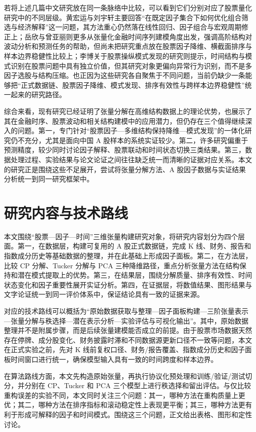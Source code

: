 若将上述几篇中文研究放在同一条脉络中比较，可以看到它们分别对应了股票量化研究中的不同层级。黄宏运与刘宇轩主要回答“在既定因子集合下如何优化组合筛选与经济解释”这一问题，其方法重心仍然落在线性回归、因子组合与宏观周期修正上；岳欣与曾亚丽则更多从张量化金融时间序列建模角度出发，强调高阶结构对波动分析和预测任务的帮助，但尚未把研究重点放在股票因子降维、横截面排序与样本边界稳健性比较上；李博关于股票操纵模式发现的研究则提示，时间结构与模式识别在股票问题中具有独立价值，但其研究对象更偏向异常行为识别，而不是多因子选股与结构压缩。也正因为这些研究各自聚焦于不同问题，当前仍缺少一条能够把“正式数据链、股票因子降维、模式发现、排序有效性与跨样本边界稳健性”统一起来的研究路径。

综合来看，现有研究已经证明了张量分解在高维结构数据上的理论优势，也展示了其在金融时序、股票波动和相关结构建模中的应用潜力，但仍存在三个值得继续深入的问题。第一，专门针对“股票因子—多维结构保持降维—模式发现”的一体化研究仍不充分，尤其是面向中国 A 股样本的系统实证较少。第二，许多研究偏重于预测精度，较少同时讨论因子解释、股票联动和时间状态切换三类结果。第三，数据处理过程、实验结果与论文论证之间往往缺乏统一而清晰的证据对应关系。本文的研究正是围绕这些不足展开，尝试将张量分解方法、A 股因子数据与实证结果分析统一到同一研究框架中。

\section{研究内容与技术路线}

本文围绕“股票—因子—时间”三维张量构建研究对象，将研究内容划分为四个层面。第一，在数据层，构建可复用的 A 股正式数据链，完成 K 线、财务、报告和指数成分历史等基础数据的整理，并在此基础上形成因子面板。第二，在方法层，比较 CP 分解、Tucker 分解与 PCA 三种降维路径，重点分析张量方法在结构保持和潜在模式提取上的优势。第三，在结果层，围绕分解质量、排序有效性、时间状态变化和因子重要性展开实证分析。第四，在证据层，将数值结果、图形结果与文字论证统一到同一评价体系中，保证结论具有一致的证据来源。

对应的技术路线可以概括为“原始数据获取与整理—因子面板构建—三阶张量表示—张量分解与秩选择—潜在表示分析—实验评估与可视化输出”。其中，原始数据整理并不是附属步骤，而是后续张量建模能否成立的前提。由于股票市场数据天然存在停牌、成分股变化、财务披露时滞和不同数据源更新口径不一致等问题，本文在正式实验之前，先对 K 线前复权口径、财务/报告覆盖、指数成分历史和因子面板时间窗口进行统一，确保模型输入具有一致的时间跨度和样本边界。

在算法路线方面，本文先构造原始张量，再执行协议化预处理和训练/验证/测试切分，并分别在 CP、Tucker 和 PCA 三个模型上进行秩选择和留出评估。与仅比较重构误差的实验不同，本文同时关注三个问题：其一，哪种方法在重构质量上更优；其二，哪种方法在排序指标和滚动稳定性上表现更平衡；其三，哪种方法更有利于形成可解释的因子和时间模式。围绕这三个问题，正文给出表格、图形和定性讨论。

